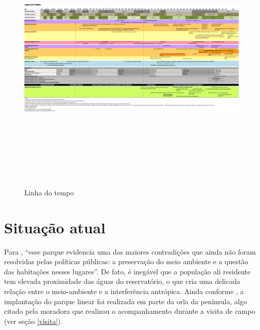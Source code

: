 	\begin{landscape}
		\begin{figure}
			\centering
			\caption{Linha do tempo}
			\includegraphics[height=12.6cm,keepaspectratio]{img/matsunaga_linha}
			\label{fig:matsunaga_linha}
		\end{figure}
	\end{landscape}
	
	\chapter{Situação atual} \label{hoje}
	
	Para , ``esse parque evidencia uma das maiores contradições que ainda não foram resolvidas pelas políticas públicas: a preservação do meio ambiente e a questão das habitações nesses lugares''. De fato, é inegável que a população ali residente tem elevada proximidade das águas do reservatório, o que cria uma delicada relação entre o meio-ambiente e a interferência antrópica. Ainda conforme , a implantação do parque linear foi realizada em parte da orla da península, algo citado pela moradora que realizou o acompanhamento durante a visita de campo (ver seção \ref{visita}).
	
